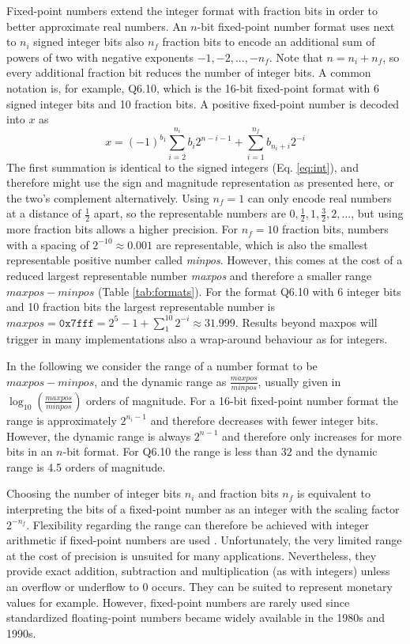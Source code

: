 Fixed-point numbers extend the integer format with fraction bits in order to better approximate real numbers. 
An $n$-bit fixed-point number format uses next to $n_i$ signed integer bits also $n_f$ fraction bits to encode 
an additional sum of powers of two with negative exponents $-1,-2,...,-n_f$. Note that $n = n_i + n_f$, so
every additional fraction bit reduces the number of integer bits. A common notation is, for example,
Q6.10, which is the 16-bit fixed-point format with 6 signed integer bits and 10 fraction bits.
A positive fixed-point number is decoded into $x$ as
\begin{equation}
x = (-1)^{b_1}\sum_{i=2}^{n_i} b_i 2^{n-i-1}  + \sum_{i=1}^{n_f} b_{n_i+i} 2^{-i}
\label{eq:fixpoints}
\end{equation}
The first summation is identical to the signed integers (Eq. \ref{eq:int}), and therefore might use the sign and magnitude
representation as presented here, or the two's complement alternatively. Using $n_f = 1$ can only encode real numbers
at a distance of $\tfrac{1}{2}$ apart, so the representable numbers are $0,\tfrac{1}{2},1,\tfrac{3}{2},2,...$, but using more fraction
bits allows a higher precision. For $n_f=10$ fraction bits, numbers with a spacing of $2^{-10} \approx 0.001$ are representable,
which is also the smallest representable positive number called \emph{minpos}. However, this comes at the cost of a reduced
largest representable number \emph{maxpos} and therefore a smaller range $maxpos-minpos$ (Table \ref{tab:formats}).
For the format Q6.10 with 6 integer bits and 10 fraction bits the largest representable number is $maxpos = \mathtt{0x7fff} = 2^5-1 + \sum_1^{10} 2^{-i}
\approx 31.999$. Results beyond maxpos will trigger in many implementations also a wrap-around behaviour as for integers.

In the following we consider the range of a number format to be $maxpos-minpos$, and the dynamic range as
$\tfrac{maxpos}{minpos}$, usually given in $\log_{10}(\tfrac{maxpos}{minpos})$ orders of magnitude. For a 16-bit fixed-point
number format the range is approximately $2^{n_i-1}$ and therefore decreases with fewer integer bits.
However, the dynamic range is always $2^{n-1}$ and therefore only increases for more bits in an $n$-bit format. For Q6.10
the range is less than $32$ and the dynamic range is 4.5 orders of magnitude.

Choosing the number of integer bits $n_i$ and fraction bits $n_f$ is equivalent to interpreting the bits of a fixed-point number
as an integer with the scaling factor $2^{-n_f}$. Flexibility regarding the range can therefore be achieved with
integer arithmetic if fixed-point numbers are used \citep{Russell2017}. Unfortunately, the very limited range at the cost of precision 
is unsuited for many applications. Nevertheless, they provide exact addition, subtraction and multiplication (as with integers) unless an
overflow or underflow to 0 occurs. They can be suited to represent monetary values for example. However, fixed-point numbers
are rarely used since standardized floating-point numbers became widely available in the 1980s and 1990s.

